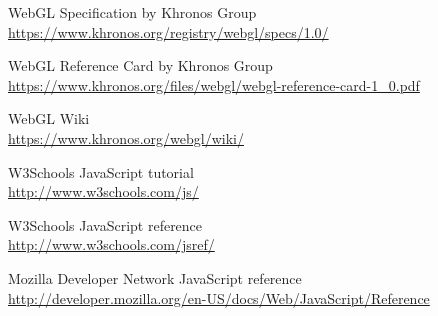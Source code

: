 \pagestyle{bibliographyStyle}
\thispagestyle{chapterBeginStyle}
\begin{thebibliography}{9}
	
	WebGL Specification by Khronos Group\\
	\url{https://www.khronos.org/registry/webgl/specs/1.0/}
	
	WebGL Reference Card by Khronos Group\\
	\url{https://www.khronos.org/files/webgl/webgl-reference-card-1_0.pdf}
	
	WebGL Wiki\\
	\url{https://www.khronos.org/webgl/wiki/}
	
	W3Schools JavaScript tutorial\\
	\url{http://www.w3schools.com/js/}
	
	W3Schools JavaScript reference\\
	\url{http://www.w3schools.com/jsref/}
	
	Mozilla Developer Network JavaScript reference\\
	\url{http://developer.mozilla.org/en-US/docs/Web/JavaScript/Reference}
	
\end{thebibliography}
\cleardoublepage